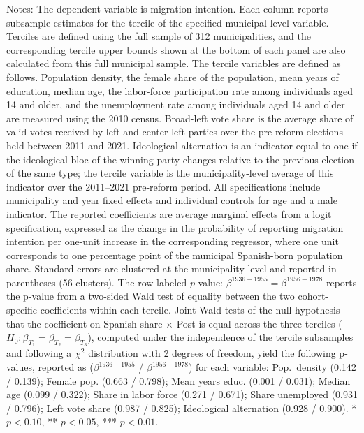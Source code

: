 \begin{table}[!h]
\caption*{\footnotesize Notes: The dependent variable is migration intention. Each column reports subsample estimates for the tercile of the specified municipal-level variable. Terciles are defined using the full sample of 312 municipalities, and the corresponding tercile upper bounds shown at the bottom of each panel are also calculated from this full municipal sample. The tercile variables are defined as follows. Population density, the female share of the population, mean years of education, median age, the labor-force participation rate among individuals aged 14 and older, and the unemployment rate among individuals aged 14 and older are measured using the 2010 census. Broad-left vote share is the average share of valid votes received by left and center-left parties over the pre-reform elections held between 2011 and 2021. Ideological alternation is an indicator equal to one if the ideological bloc of the winning party changes relative to the previous election of the same type; the tercile variable is the municipality-level average of this indicator over the 2011--2021 pre-reform period. All specifications include municipality and year fixed effects and individual controls for age and a male indicator. The reported coefficients are average marginal effects from a logit specification, expressed as the change in the probability of reporting migration intention per one-unit increase in the corresponding regressor, where one unit corresponds to one percentage point of the municipal Spanish-born population share. Standard errors are clustered at the municipality level and reported in parentheses (56 clusters). The row labeled $p$-value: $\beta^{1936-1955}=\beta^{1956-1978}$ reports the p-value from a two-sided Wald test of equality between the two cohort-specific coefficients within each tercile. Joint Wald tests of the null hypothesis that the coefficient on Spanish share $\times$ Post is equal across the three terciles ($H_0: \beta_{T_1} = \beta_{T_2} = \beta_{T_3}$), computed under the independence of the tercile subsamples and following a $\chi^2$ distribution with 2 degrees of freedom, yield the following p-values, reported as ($\beta^{1936-1955}$ / $\beta^{1956-1978}$) for each variable: Pop.\ density (0.142 / 0.139); Female pop. (0.663 / 0.798); Mean years educ. (0.001 / 0.031); Median age (0.099 / 0.322); Share in labor force (0.271 / 0.671); Share unemployed (0.931 / 0.796); Left vote share (0.987 / 0.825); Ideological alternation (0.928 / 0.900). * $p<0.10$, ** $p<0.05$, *** $p<0.01$.}
\end{table}
